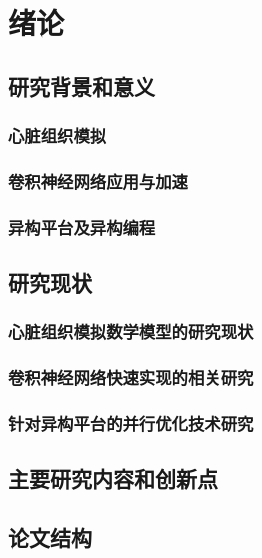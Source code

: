\chapter{绪论}

\section{研究背景和意义}


\subsection{心脏组织模拟}


\subsection{卷积神经网络应用与加速}


\subsection{异构平台及异构编程}


\section{研究现状}

\subsection{心脏组织模拟数学模型的研究现状}


\subsection{卷积神经网络快速实现的相关研究}


\subsection{针对异构平台的并行优化技术研究}


\section{主要研究内容和创新点}


\section{论文结构}







